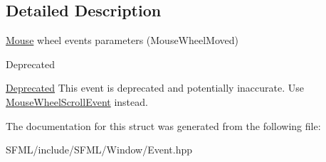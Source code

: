 \subsection{Detailed Description}
\mbox{\hyperlink{classsf_1_1_mouse}{Mouse}} wheel events parameters (Mouse\+Wheel\+Moved) 

\begin{DoxyRefDesc}{Deprecated}
\item[\mbox{\hyperlink{deprecated__deprecated000018}{Deprecated}}]This event is deprecated and potentially inaccurate. Use \mbox{\hyperlink{structsf_1_1_event_1_1_mouse_wheel_scroll_event}{Mouse\+Wheel\+Scroll\+Event}} instead. \end{DoxyRefDesc}
\begin{DoxyVerb}\end{DoxyVerb}
 

The documentation for this struct was generated from the following file\+:\begin{DoxyCompactItemize}
\item 
S\+F\+M\+L/include/\+S\+F\+M\+L/\+Window/Event.\+hpp\end{DoxyCompactItemize}
